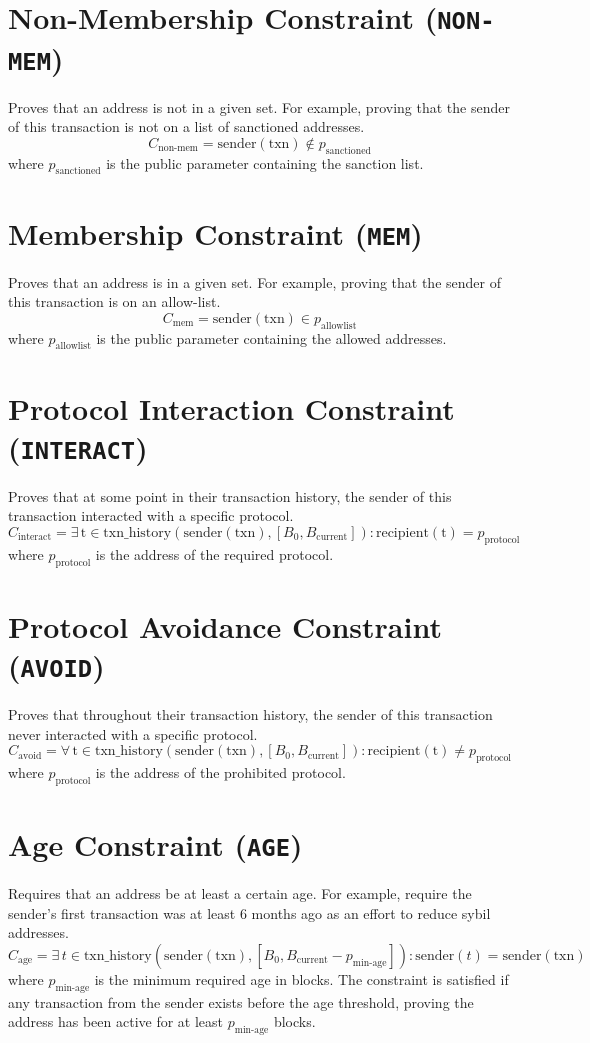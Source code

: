 \documentclass[9pt]{extreport}
\begin{document}
\section{Non-Membership Constraint (\texttt{NON-MEM})}Proves that an address is not in a given set. For example, proving that the sender of this transaction is not on a list of sanctioned addresses.
$$C_{\text{non-mem}} = \text{sender}(\text{txn}) \notin p_{\text{sanctioned}}$$
where $p_{\text{sanctioned}}$ is the public parameter containing the sanction list.

\section{Membership Constraint (\texttt{MEM})} Proves that an address is in a given set. For example, proving that the sender of this transaction is on an allow-list.
$$C_{\text{mem}} = \text{sender}(\text{txn}) \in p_{\text{allowlist}}$$
where $p_{\text{allowlist}}$ is the public parameter containing the allowed addresses.

\section{Protocol Interaction Constraint (\texttt{INTERACT})}Proves that at some point in their transaction history, the sender of this transaction interacted with a specific protocol.
$$C_{\text{interact}} = \exists \, \text{t} \in \text{txn\_history}(\text{sender}(\text{txn}), [B_0, B_{\text{current}}]) : \text{recipient}(\text{t}) = p_{\text{protocol}}$$
where $p_{\text{protocol}}$ is the address of the required protocol.

\section{Protocol Avoidance Constraint (\texttt{AVOID})}Proves that throughout their transaction history, the sender of this transaction never interacted with a specific protocol.
$$C_{\text{avoid}} = \forall \, \text{t} \in \text{txn\_history}(\text{sender}(\text{txn}), [B_0, B_{\text{current}}]) : \text{recipient}(\text{t}) \neq p_{\text{protocol}}$$
where $p_{\text{protocol}}$ is the address of the prohibited protocol.

\section{Age Constraint (\texttt{AGE})}
Requires that an address be at least a certain age. For example, require the sender's first transaction was at least 6 months ago as an effort to reduce sybil addresses.
$$C_{\text{age}} = \exists \, t \in \text{txn\_history}(\text{sender}(\text{txn}), [B_0, B_{\text{current}} - p_{\text{min-age}}]) : \text{sender}(t) = \text{sender}(\text{txn})$$
where $p_{\text{min-age}}$ is the minimum required age in blocks. The constraint is satisfied if any transaction from the sender exists before the age threshold, proving the address has been active for at least $p_{\text{min-age}}$ blocks.
\end{document}
